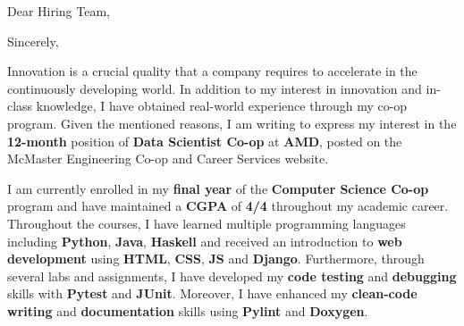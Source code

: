 \documentclass[12pt,letterpaper,sans]{moderncv} %
\begin{document}


\clearpage

\vspace{-2.0em}
\date{\today} %
\opening{Dear Hiring Team,} %
\closing{Sincerely,} %


\makelettertitle %

\justifying

Innovation is a crucial quality that a company requires to accelerate in the continuously developing world. In addition to my interest in innovation and in-class knowledge, I have obtained real-world experience through my co-op program. Given the mentioned reasons, I am writing to express my interest in the \textbf{12-month} position of \textbf{Data Scientist Co-op} at \textbf{AMD}, posted on the McMaster Engineering Co-op and Career Services website.

I am currently enrolled in my \textbf{final year} of the \textbf{Computer Science Co-op} program and have maintained a \textbf{CGPA} of \textbf{4/4} throughout my academic career. Throughout the courses, I have learned multiple programming languages including \textbf{Python}, \textbf{Java}, \textbf{Haskell} and received an introduction to \textbf{web development} using \textbf{HTML}, \textbf{CSS}, \textbf{JS} and \textbf{Django}. Furthermore, through several labs and assignments, I have developed my \textbf{code testing} and \textbf{debugging} skills with \textbf{Pytest} and \textbf{JUnit}. Moreover, I have enhanced my \textbf{clean-code writing} and \textbf{documentation} skills using \textbf{Pylint} and \textbf{Doxygen}.
\end{document}
